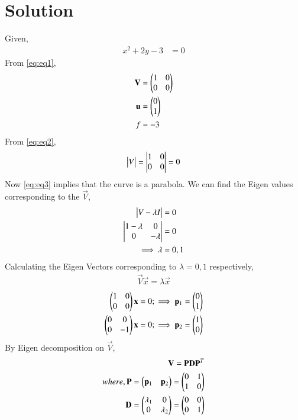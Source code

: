 \documentclass[journal,12pt,twocolumn]{IEEEtran}
\begin{document}
\section{\textbf{Solution}}
Given, 
\begin{align}
	x^2 + 2y - 3 &= 0 \label{eq:eq1}
\end{align}
From \eqref{eq:eq1}, 
\begin{align} 
    \mathbf{V} &= \begin{pmatrix}1 & 0 \\ 0 & 0\end{pmatrix} \label{eq:eq2} \\
    \mathbf{u} &= \begin{pmatrix}0 \\ 1\end{pmatrix} \\
    f &= -3
\end{align}
From \eqref{eq:eq2},
\begin{align}
    \begin{vmatrix}V\end{vmatrix} = \begin{vmatrix}1 & 0 \\ 0 & 0\end{vmatrix} = 0 \label{eq:eq3}
\end{align}
Now \eqref{eq:eq3} implies that the curve is a parabola. We can find the Eigen values corresponding to the $\vec{V}$,
\begin{align}
    \begin{vmatrix}V-\lambda I\end{vmatrix} &= 0 \nonumber \\
    \begin{vmatrix}1-\lambda & 0 \\ 0 & -\lambda\end{vmatrix} &= 0 \nonumber \\
    \implies \lambda &= 0,1 \label{eq:eq4}
\end{align}
Calculating the Eigen Vectors corresponding to $\lambda=0,1$ respectively,
\begin{align}
    \vec{V}\vec{x} = \lambda\vec{x} \nonumber 
\end{align}
\begin{align}
    \begin{pmatrix}1 & 0 \\ 0 & 0\end{pmatrix}\mathbf{x} = 0;\implies \mathbf{p}_1 = \begin{pmatrix}0 \\ 1\end{pmatrix} \label{eq:eq5} \\
    \begin{pmatrix}0 & 0 \\ 0 & -1\end{pmatrix}\mathbf{x} = 0;\implies \mathbf{p}_2 = \begin{pmatrix}1 \\ 0\end{pmatrix} \label{eq:eq6}
\end{align}
By Eigen decomposition on $\vec{V}$,
\begin{align}
    \mathbf{V} = \mathbf{P}\mathbf{D}\mathbf{P}^T \nonumber \\
    where, \mathbf{P} = \begin{pmatrix}\mathbf{p}_1 & \mathbf{p}_2\end{pmatrix} = \begin{pmatrix}0 & 1 \\ 1 & 0\end{pmatrix} \label{eq:eq7} \\
    \mathbf{D} = \begin{pmatrix}\lambda_1 & 0 \\ 0 & \lambda_2\end{pmatrix} = \begin{pmatrix}0 & 0 \\ 0 & 1\end{pmatrix} \label{eq:eq8}
\end{align}
\end{document}
